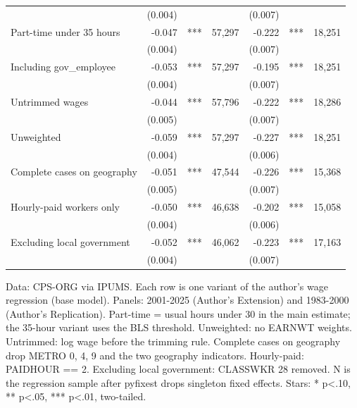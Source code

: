 \begin{table}[!t]
\begin{tabular*}{\linewidth}{@{\extracolsep{\fill}}l|rlrrlr}
 & (0.004) &  &  & (0.007) &  &  \\
Part-time under 35 hours & -0.047 & *** & 57,297 & -0.222 & *** & 18,251 \\
 & (0.004) &  &  & (0.007) &  &  \\
Including gov\_employee & -0.053 & *** & 57,297 & -0.195 & *** & 18,251 \\
 & (0.004) &  &  & (0.007) &  &  \\
Untrimmed wages & -0.044 & *** & 57,796 & -0.222 & *** & 18,286 \\
 & (0.005) &  &  & (0.007) &  &  \\
Unweighted & -0.059 & *** & 57,297 & -0.227 & *** & 18,251 \\
 & (0.004) &  &  & (0.006) &  &  \\
Complete cases on geography & -0.051 & *** & 47,544 & -0.226 & *** & 15,368 \\
 & (0.005) &  &  & (0.007) &  &  \\
Hourly-paid workers only & -0.050 & *** & 46,638 & -0.202 & *** & 15,058 \\
 & (0.004) &  &  & (0.006) &  &  \\
Excluding local government & -0.052 & *** & 46,062 & -0.223 & *** & 17,163 \\
 & (0.004) &  &  & (0.007) &  &  \\
\bottomrule
\end{tabular*}
\begin{minipage}{\linewidth}
Data: CPS-ORG via IPUMS. Each row is one variant of the author's wage regression (base model). Panels: 2001-2025 (Author's Extension) and 1983-2000 (Author's Replication). Part-time = usual hours under 30 in the main estimate; the 35-hour variant uses the BLS threshold. Unweighted: no EARNWT weights. Untrimmed: log wage before the trimming rule. Complete cases on geography drop METRO 0, 4, 9 and the two geography indicators. Hourly-paid: PAIDHOUR == 2. Excluding local government: CLASSWKR 28 removed. N is the regression sample after pyfixest drops singleton fixed effects. Stars: * p<.10, ** p<.05, *** p<.01, two-tailed.\\
\end{minipage}
\end{table}
